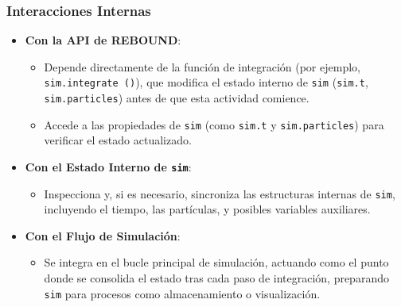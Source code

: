 \subsubsection{Interacciones Internas}
\begin{itemize}
    \item \textbf{Con la API de REBOUND}:
    \begin{itemize}
        \item Depende directamente de la función de integración (por ejemplo, \texttt{sim.integrate~()}), que modifica el estado interno de \texttt{sim} (\texttt{sim.t}, \texttt{sim.particles}) antes de que esta actividad comience.
        \item Accede a las propiedades de \texttt{sim} (como \texttt{sim.t} y \texttt{sim.particles}) para verificar el estado actualizado.
    \end{itemize}
    \item \textbf{Con el Estado Interno de \texttt{sim}}:
    \begin{itemize}
        \item Inspecciona y, si es necesario, sincroniza las estructuras internas de \texttt{sim}, incluyendo el tiempo, las partículas, y posibles variables auxiliares.
    \end{itemize}
    \item \textbf{Con el Flujo de Simulación}:
    \begin{itemize}
        \item Se integra en el bucle principal de simulación, actuando como el punto donde se consolida el estado tras cada paso de integración, preparando \texttt{sim} para procesos como almacenamiento o visualización.
    \end{itemize}
\end{itemize}

